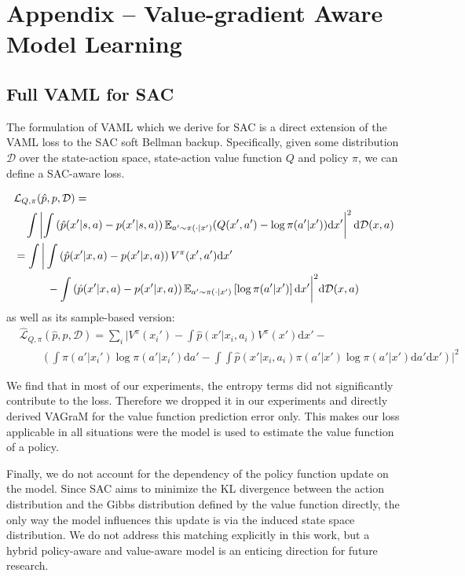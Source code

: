 \chapter{Appendix -- Value-gradient Aware Model Learning}

\section{Full VAML for SAC}
\label{app:vagram:vaml_sac}
The formulation of VAML which we derive for SAC is a direct extension of the VAML loss to the SAC soft Bellman backup. Specifically, given some distribution $\mathcal{D}$ over the state-action space, state-action value function $Q$ and policy $\pi$, we can define a SAC-aware loss.

\begin{align}
    &\mathcal{L}_{Q, \pi}(\hat{p}, p, \mathcal{D}) = \nonumber\\
    &\quad \int \left|\int \left(\hat{p}(x'|s,a) - p(x'|s,a)\right) \mathbb{E}_{a' \sim \pi(\cdot| x')}{\left(Q(x', a') - \log \pi(a'|x')\right)} \mathrm{d}x'\right|^2 \mathrm{d} \mathcal{D}(x,a)\\
    &= \int \bigg|\int \left(\hat{p}(x'|x,a) - p(x'|x,a)\right) V^\pi(x', a')\mathrm{d}x' \nonumber\\
    &\quad\quad\quad- \int \left(\hat{p}(x'|x,a) - p(x'|x,a)\right)\mathbb{E}_{a' \sim \pi(\cdot| x')}\left[\log \pi(a'|x')\right] \mathrm{d}x'\bigg|^2 \mathrm{d} \mathcal{D}(x,a)
\end{align}
as well as its sample-based version:
\begin{align}
    &\hat{\mathcal{L}}_{Q, \pi}(\hat{p}, p, \mathcal{D}) = \sum_{i} \bigg|V^\pi(x_i') -\int \hat{p}(x'|x_i, a_i) V^\pi(x') \mathrm{d}x' - \nonumber\\&\quad\quad\left(\int \pi(a'|x_i')\log\pi(a' | x_i') \mathrm{d}a'- \int \int \hat{p}(x'|x_i,a_i)\pi(a'|x')\log\pi(a' | x')\mathrm{d}a' \mathrm{d}x' \right)\bigg|^2\label{SACVAMLLoss}
\end{align}

We find that in most of our experiments, the entropy terms did not significantly contribute to the loss. 
Therefore we dropped it in our experiments and directly derived VAGraM for the value function prediction error only.
This makes our loss applicable in all situations were the model is used to estimate the value function of a policy.

Finally, we do not account for the dependency of the policy function update on the model.
Since SAC aims to minimize the KL divergence between the action distribution and the Gibbs distribution defined by the value function directly, the only way the model influences this update is via the induced state space distribution.
We do not address this matching explicitly in this work, but a hybrid policy-aware and value-aware model is an enticing direction for future research.

